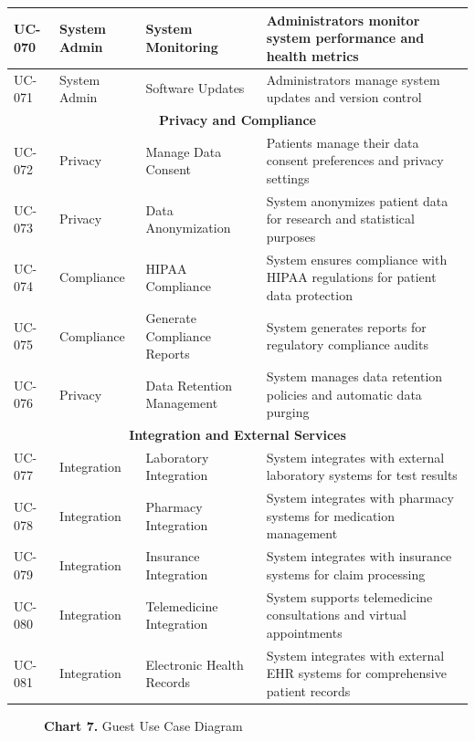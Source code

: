 \documentclass[12pt,a4paper]{article}
\begin{document}
\begin{longtable}{|p{1cm}|p{3cm}|p{3cm}|p{7cm}|}
\hline
UC-070 & System Admin & System Monitoring & Administrators monitor system performance and health metrics \\
\hline
UC-071 & System Admin & Software Updates & Administrators manage system updates and version control \\
\hline
\multicolumn{4}{|c|}{\textbf{Privacy and Compliance}} \\
\hline
UC-072 & Privacy & Manage Data Consent & Patients manage their data consent preferences and privacy settings \\
\hline
UC-073 & Privacy & Data Anonymization & System anonymizes patient data for research and statistical purposes \\
\hline
UC-074 & Compliance & HIPAA Compliance & System ensures compliance with HIPAA regulations for patient data protection \\
\hline
UC-075 & Compliance & Generate Compliance Reports & System generates reports for regulatory compliance audits \\
\hline
UC-076 & Privacy & Data Retention Management & System manages data retention policies and automatic data purging \\
\hline
\multicolumn{4}{|c|}{\textbf{Integration and External Services}} \\
\hline
UC-077 & Integration & Laboratory Integration & System integrates with external laboratory systems for test results \\
\hline
UC-078 & Integration & Pharmacy Integration & System integrates with pharmacy systems for medication management \\
\hline
UC-079 & Integration & Insurance Integration & System integrates with insurance systems for claim processing \\
\hline
UC-080 & Integration & Telemedicine Integration & System supports telemedicine consultations and virtual appointments \\
\hline
UC-081 & Integration & Electronic Health Records & System integrates with external EHR systems for comprehensive patient records \\
\hline
\end{longtable}
\begin{figure}[H]
    \centering
    
    \caption*{\textbf{Chart 7.} Guest Use Case Diagram}
\end{figure}
\end{document}
